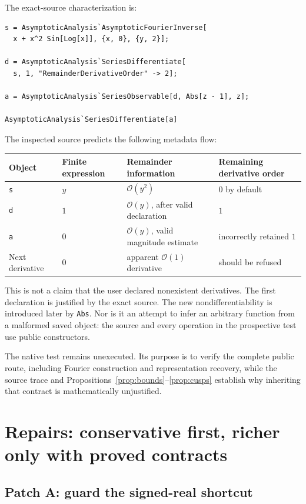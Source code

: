 \documentclass[11pt,a4paper]{article}
\newcommand{\code}[1]{\nolinkurl{#1}}
\newcommand{\OO}{\mathcal O}
\begin{document}
The exact-source characterization is:
\begin{lstlisting}
s = AsymptoticAnalysis`AsymptoticFourierInverse[
  x + x^2 Sin[Log[x]], {x, 0}, {y, 2}];

d = AsymptoticAnalysis`SeriesDifferentiate[
  s, 1, "RemainderDerivativeOrder" -> 2];

a = AsymptoticAnalysis`SeriesObservable[d, Abs[z - 1], z];

AsymptoticAnalysis`SeriesDifferentiate[a]
\end{lstlisting}
The inspected source predicts the following metadata flow:
\begin{center}
\begin{tabular}{L{20mm}L{47mm}L{48mm}L{30mm}}
\toprule
Object & Finite expression & Remainder information & Remaining derivative order\\
\midrule
\code{s} & $y$ & $\OO(y^2)$ & $0$ by default\\
\code{d} & $1$ & $\OO(y)$, after valid declaration & $1$\\
\code{a} & $0$ & $\OO(y)$, valid magnitude estimate & incorrectly retained $1$\\
Next derivative & $0$ & apparent $\OO(1)$ derivative & should be refused\\
\bottomrule
\end{tabular}
\end{center}

This is not a claim that the user declared nonexistent derivatives. The first declaration is justified by the exact source. The new nondifferentiability is introduced later by \code{Abs}. Nor is it an attempt to infer an arbitrary function from a malformed saved object: the source and every operation in the prospective test use public constructors.

The native test remains unexecuted. Its purpose is to verify the complete public route, including Fourier construction and representation recovery, while the source trace and Propositions~\ref{prop:bounds}--\ref{prop:cusps} establish why inheriting that contract is mathematically unjustified.

\section{Repairs: conservative first, richer only with proved contracts}
\subsection{Patch A: guard the signed-real shortcut}
\end{document}
